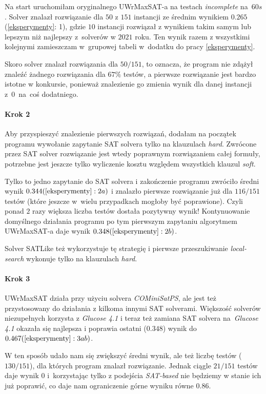 \documentclass[shortabstract]{iithesis}
\begin{document}
Na start uruchomiłam oryginalnego UWrMaxSAT-a na testach \textit{incomplete} na~$60s$.
Solver znalazł rozwiązanie dla $50$ z $151$ instancji ze średnim wynikiem $0.265$ (\ref{eksperymenty}: 1), gdzie $10$ instancji rozwiązał z wynikiem takim samym lub lepszym niż najlepszy z~solverów w $2021$ roku.
Ten wynik razem z wszystkimi kolejnymi zamieszczam w~grupowej tabeli w~dodatku do pracy \ref{eksperymenty}.

Skoro solver znalazł rozwiązania dla $50/151$, to oznacza, że program nie zdążył znaleźć żadnego rozwiązania dla $67\%$ testów, a pierwsze rozwiązanie 
jest bardzo istotne w konkursie, ponieważ znalezienie go zmienia wynik dla danej instancji z~0~na~coś dodatniego.
\paragraph{Krok 2}
Aby przyspieszyć znalezienie pierwszych rozwiązań, dodałam na początek programu wywołanie zapytanie SAT solvera tylko na klauzulach \textit{hard}. Zwrócone przez SAT solver rozwiązanie jest wtedy poprawnym rozwiązaniem całej formuły, potrzebne jest jeszcze tylko wyliczenie kosztu względem wszystkich klauzul \textit{soft}. 

Tylko to jedno zapytanie do SAT solvera i zakończenie programu zwróciło średni wynik $0.344 (\ref{eksperymenty}: 2a)$ i znalazło pierwsze rozwiązanie już dla $116/151$ testów (które jeszcze w~wielu przypadkach mogłoby być poprawione). Czyli ponad $2$ razy większa liczba testów dostała pozytywny wynik!
Kontynuowanie domyślnego działania programu po tym pierwszym zapytaniu algorytmem UWrMaxSAT-a daje wynik $0.348 (\ref{eksperymenty}: 2b)$.

Solver SATLike  też wykorzystuje tę strategię i pierwsze przeszukiwanie \textit{local-search} wykonuje tylko na klauzulach \textit{hard}.
  
\paragraph{Krok 3}
UWrMaxSAT działa przy użyciu solvera \textit{COMiniSatPS}, ale jest też przystosowany do działania z kilkoma innymi SAT solverami. Większość solverów niezupełnych korzysta z \textit{Glucose 4.1} i teraz też zamiana SAT solvera na~\textit{Glucose 4.1} okazała się najlepsza i poprawia ostatni ($0.348$) wynik do $0.467 (\ref{eksperymenty}: 3ab)$.

W ten sposób udało nam się zwiększyć średni wynik, ale też liczbę testów ($130/151$), dla których program znalazł rozwiązanie. Jednak ciągle $21/151$ testów daje wynik $0$ i~korzystając tylko z podejścia \textit{SAT-based} nie będziemy w stanie ich już poprawić, co daje nam ograniczenie górne wyniku równe $0.86$. 
\end{document}
